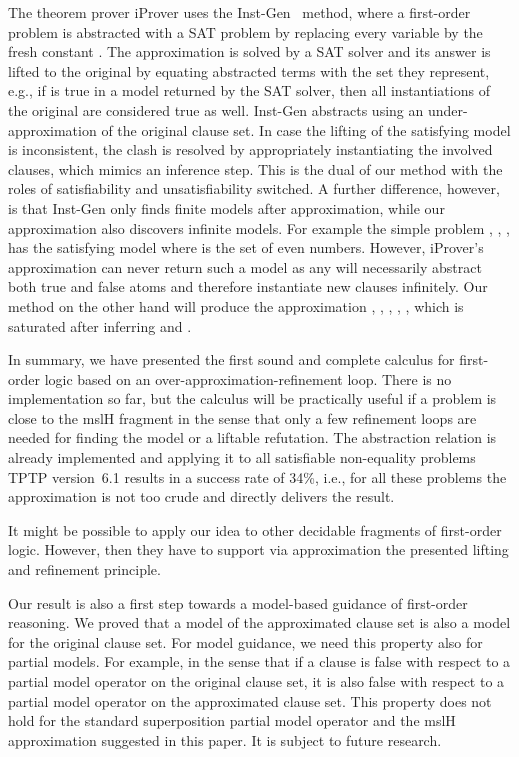 \documentclass{llncs}
\begin{document}
The theorem prover iProver uses the Inst-Gen~\cite{DBLP:conf/birthday/Korovin13} method, 
where a first-order problem is abstracted with a SAT problem by replacing every variable by the fresh constant . 
The approximation is solved by a SAT solver and its answer is lifted to the original 
by equating abstracted terms with the set they represent, e.g., if  is true in a
 model returned by the SAT solver, then all instantiations of the original  are 
considered true as well. 
Inst-Gen abstracts using an  under-approximation of the original clause set.
In case the lifting of the satisfying model is inconsistent, 
the clash is resolved by appropriately instantiating the involved clauses, which mimics an inference step.
This is the dual of our method with the roles of satisfiability and unsatisfiability switched.
A further difference, however, is that Inst-Gen only finds finite models after approximation, 
while our approximation also discovers infinite models.
For example the simple problem , , ,  has the satisfying model where  is the set of even numbers.
However, iProver's approximation can never return such a model as any  will necessarily abstract both true and false atoms and therefore instantiate new clauses infinitely. 
Our method on the other hand will produce the approximation , , ,  ,  , which  is saturated after inferring  and .

In summary, we have presented the first sound and complete calculus for
first-order logic based on an over-approximation-refinement loop. There
is no implementation so far, but the calculus will be practically useful if a problem
is close to the mslH fragment in the sense that only a few refinement loops
are needed for finding the model or a liftable refutation. 
The abstraction relation is already implemented and applying it to all satisfiable non-equality
problems TPTP version~6.1 results in a success rate of 34\%, i.e., for all these problems
the approximation is not too crude and directly delivers the result.

It might be possible
to apply our idea to other decidable fragments of first-order logic.
However, then they have to support via approximation the presented lifting and refinement
principle. 

Our result is also a first step towards a  model-based guidance of first-order
reasoning. We proved that a model of the approximated clause set is also a model for the
original clause set. For model guidance, we need this property also for partial models. For example,
in the sense that if a clause is false with respect to a partial model operator on
the original clause set, it is also false with respect to a partial model operator on
the approximated clause set. This property does not hold for the standard superposition partial
model operator and the mslH approximation suggested in this paper. It is subject to future research.
\end{document}
